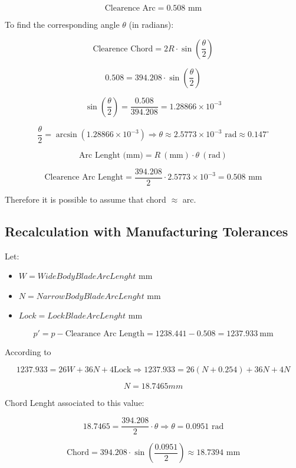 \[
\text{Clearence Arc} = 0.508 \text{ mm}
\]

To find the corresponding angle $\theta$ (in radians):

\[
\text{Clearence Chord} = 2R \cdot \sin\left(\frac{\theta}{2}\right)
\]


\[
0.508 = 394.208 \cdot \sin\left(\frac{\theta}{2}\right)
\]

\[
\sin\left(\frac{\theta}{2}\right) = \frac{0.508}{394.208} = 1.28866 \times 10^{-3}
\]

\[
\frac{\theta}{2} = \arcsin(1.28866 \times 10^{-3}) \Rightarrow \theta \approx 2.5773 \times 10^{-3} \text{ rad} \approx 0.147^\circ
\]

\[
\text{Arc Lenght (mm)} = R~(\text{mm}) \cdot \theta~(\text{rad})
\]

\[
\text{Clearence Arc Lenght} = \frac{394.208}{2} \cdot 2.5773 \times 10^{-3} = 0.508 \text{ mm}
\]


Therefore it is possible to assume that chord $\approx$ arc.

\subsection*{Recalculation with Manufacturing Tolerances}

Let:
\begin{itemize}
    \item $W = Wide Body Blade Arc Lenght$ mm 
    \item $N = Narrow Body Blade Arc Lenght$ mm
    \item $Lock = Lock Blade Arc Lenght$ mm
\end{itemize}

\[
p' = p - \text{Clearance Arc Length} = 1238.441 - 0.508 = 1237.933~\text{mm}
\]


According to 

\[
1237.933 = 26W + 36N + 4 \text{Lock} \Rightarrow 1237.933 = 26(N + 0.254) + 36N + 4N
\]

\[
N = 18.7465mm
\]

Chord Lenght associated to this value:

\[
18.7465 = \frac{394.208}{2} \cdot \theta \Rightarrow \theta = 0.0951 \text{ rad}
\]

\[
\text{Chord} = 394.208 \cdot \sin\left(\frac{0.0951}{2}\right) \approx 18.7394 \text{ mm}
\]



